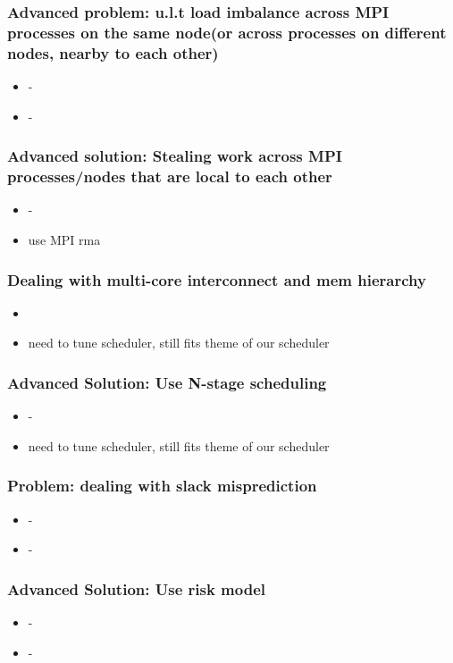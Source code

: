 \begin{frame}
\frametitle{Advanced problem: u.l.t load imbalance across MPI processes on the same node(or across processes on different nodes, nearby to each other) }
\begin{itemize}
\item \small -
\item \small -
\end{itemize}
\end{frame}

\begin{frame}
\frametitle{Advanced solution: Stealing work across MPI processes/nodes that are local to each other}
\begin{itemize}
\item \small -
\item \small use MPI rma
\end{itemize}
\end{frame}



\begin{frame}
\frametitle{ Dealing with multi-core interconnect and mem hierarchy}
\begin{itemize}
\item \small
\item \small need to tune scheduler, still fits theme of our scheduler
\end{itemize}
\end{frame}

\begin{frame}
\frametitle{ Advanced Solution: Use N-stage scheduling}
\begin{itemize}
\item \small -
\item \small need to tune scheduler, still fits theme of our scheduler
\end{itemize}
\end{frame}


\begin{frame}
\frametitle{ Problem: dealing with slack misprediction  }
\begin{itemize}
\item \small -
\item \small -
\end{itemize}
\end{frame}

\begin{frame}
\frametitle{Advanced Solution: Use risk model }
\begin{itemize}
\item \small -
\item \small -
\end{itemize}
\end{frame}

